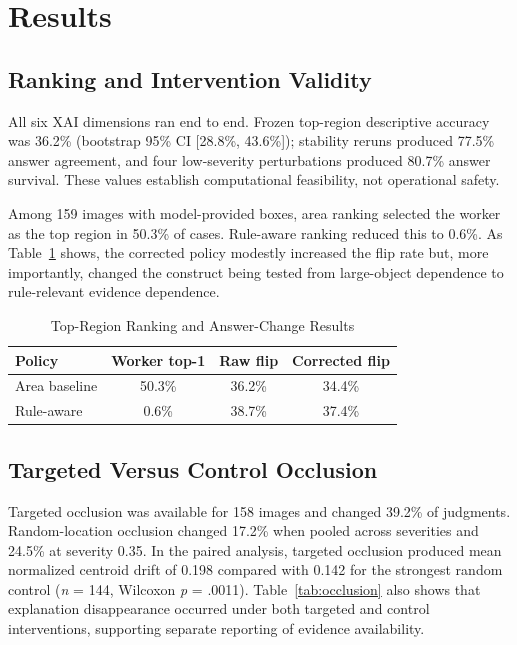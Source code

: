 \documentclass[12pt,letterpaper,twoside]{article}
\begin{document}
\section{Results}

\subsection{Ranking and Intervention Validity}

All six XAI dimensions ran end to end. Frozen top-region descriptive accuracy was 36.2\% (bootstrap 95\% CI [28.8\%, 43.6\%]); stability reruns produced 77.5\% answer agreement, and four low-severity perturbations produced 80.7\% answer survival. These values establish computational feasibility, not operational safety.

Among 159 images with model-provided boxes, area ranking selected the worker as the top region in 50.3\% of cases. Rule-aware ranking reduced this to 0.6\%. As Table~\ref{tab:ranking} shows, the corrected policy modestly increased the flip rate but, more importantly, changed the construct being tested from large-object dependence to rule-relevant evidence dependence.

\begin{table}[htbp]
\centering
\caption{Top-Region Ranking and Answer-Change Results}
\label{tab:ranking}
\begin{tabular}{@{}lccc@{}}
\toprule
Policy & Worker top-1 & Raw flip & Corrected flip \\
\midrule
Area baseline & 50.3\% & 36.2\% & 34.4\% \\
Rule-aware & 0.6\% & 38.7\% & 37.4\% \\
\bottomrule
\end{tabular}
\end{table}

\subsection{Targeted Versus Control Occlusion}

Targeted occlusion was available for 158 images and changed 39.2\% of judgments. Random-location occlusion changed 17.2\% when pooled across severities and 24.5\% at severity 0.35. In the paired analysis, targeted occlusion produced mean normalized centroid drift of 0.198 compared with 0.142 for the strongest random control (\textit{n} = 144, Wilcoxon \textit{p} = .0011). Table~\ref{tab:occlusion} also shows that explanation disappearance occurred under both targeted and control interventions, supporting separate reporting of evidence availability.
\end{document}
